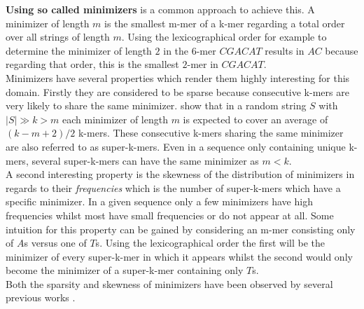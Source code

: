 \documentclass[a4paper,titlepage,onecolumn,oneside,12pt,nenglish,titlepage=firstiscover]{scrbook}
\theoremstyle{plain} %
\theoremstyle{definition} %
\theoremstyle{remark} %
\theoremstyle{plain}
\begin{document}
\textbf{Using so called minimizers} is a common approach to achieve this. A minimizer of length $m$ is the smallest m-mer of a k-mer regarding a total order over all strings of length $m$. Using the lexicographical order for example to determine the minimizer of length $2$ in the $6$-mer $CGACAT$ results in $AC$ because regarding that order, this is the smallest $2$-mer in $CGACAT$.\\
Minimizers have several properties which render them highly interesting for this domain. Firstly they are considered to be sparse because consecutive k-mers are very likely to share the same minimizer.  show that in a random string $S$ with $|S| \gg k > m$ each minimizer of length $m$ is expected to cover an average of $(k-m+2)/2$ k-mers. These consecutive k-mers sharing the same minimizer are also referred to as super-k-mers. Even in a sequence only containing unique k-mers, several super-k-mers can have the same minimizer as $m < k$.\\
A second interesting property is the skewness of the distribution of minimizers in regards to their \textit{frequencies} which is the number of super-k-mers which have a specific minimizer. In a given sequence only a few  minimizers have high frequencies whilst most have small frequencies or do not appear at all. Some intuition for this property can be gained by considering an m-mer consisting only of $A$s versus one of $T$s. Using the lexicographical order the first will be the minimizer of every super-k-mer in which it appears whilst the second would only become the minimizer of a super-k-mer containing only $T$s.\\
Both the sparsity and skewness of minimizers have been observed by several previous works \cite{schulte-mattler_rshash_2026, pibiri_sparse_2022, jain_weighted_2020, chikhi_representation_2014}.
\end{document}
